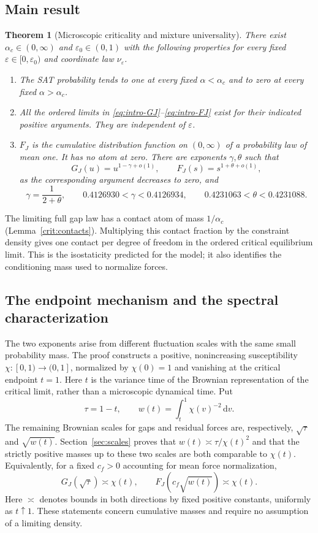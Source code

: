 \documentclass[11pt,a4paper]{article}
\numberwithin{equation}{section}
\newtheorem{theorem}{Theorem}[section]
\theoremstyle{definition}
\theoremstyle{remark}
\newcommand{\dd}{\mathrm d}
\newcommand{\eps}{\varepsilon}
\begin{document}
\subsection{Main result}
\begin{theorem}[Microscopic criticality and mixture universality]\label{thm:main}
There exist $\alpha_c\in(0,\infty)$ and $\eps_0\in(0,1)$ with the following properties for every fixed $\eps\in[0,\eps_0)$ and coordinate law $\nu_\eps$.
\begin{enumerate}[label=\textup{(\roman*)}]
\item The SAT probability tends to one at every fixed $\alpha<\alpha_c$ and to zero at every fixed $\alpha>\alpha_c$.
\item All the ordered limits in \eqref{eq:intro-GJ}--\eqref{eq:intro-FJ} exist for their indicated positive arguments. They are independent of $\eps$.
\item $F_J$ is the cumulative distribution function on $(0,\infty)$ of a probability law of mean one. It has no atom at zero. There are exponents $\gamma,\theta$ such that
\[
 G_J(u)=u^{1-\gamma+o(1)},\qquad
 F_J(s)=s^{1+\theta+o(1)},
\]
as the corresponding argument decreases to zero, and
\[
 \gamma=\frac1{2+\theta},\qquad
 0.4126930<\gamma<0.4126934,\qquad
 0.4231063<\theta<0.4231088.
\]
\end{enumerate}
\end{theorem}

The limiting full gap law has a contact atom of mass $1/\alpha_c$
(Lemma~\ref{crit:contacts}). Multiplying this contact fraction by the
constraint density gives one contact per degree of freedom in the ordered
critical equilibrium limit. This is the isostaticity predicted for the
model; it also identifies the conditioning mass used to normalize forces.

\subsection{The endpoint mechanism and the spectral characterization}
\label{subsec:intro-endpoint}
The two exponents arise from different fluctuation scales with the same
small probability mass. The proof constructs a positive, nonincreasing
susceptibility $\chi:[0,1)\to(0,1]$, normalized by $\chi(0)=1$ and
vanishing at the critical endpoint $t=1$. Here $t$ is the variance time
of the Brownian representation of the critical limit, rather than a
microscopic dynamical time. Put
\[
 \tau=1-t,\qquad w(t)=\int_t^1\chi(v)^{-2}\,\dd v.
\]
The remaining Brownian scales for gaps and residual forces are,
respectively, $\sqrt\tau$ and $\sqrt{w(t)}$. Section~\ref{sec:scales}
proves that $w(t)\asymp\tau/\chi(t)^2$ and that the strictly positive
masses up to these two scales are both comparable to $\chi(t)$.
Equivalently, for a fixed $c_f>0$ accounting for mean force normalization,
\[
 G_J(\sqrt\tau)\asymp\chi(t),\qquad
 F_J(c_f\sqrt{w(t)})\asymp\chi(t).
\]
Here $\asymp$ denotes bounds in both directions by fixed positive
constants, uniformly as $t\uparrow1$. These statements concern cumulative
masses and require no assumption of a limiting density.
\end{document}
